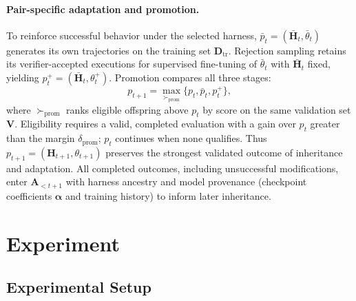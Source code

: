 \documentclass[11pt,a4paper]{article}
\begin{document}
\paragraph{Pair-specific adaptation and promotion.}
To reinforce successful behavior under the selected harness, $\bar p_t=(\bar{\mathbf{H}}_t,\bar\theta_t)$ generates its own trajectories on the training set $\mathbf{D}_{\mathrm{tr}}$. Rejection sampling retains its verifier-accepted executions for supervised fine-tuning of $\bar\theta_t$ with $\bar{\mathbf{H}}_t$ fixed, yielding $p_t^+=(\bar{\mathbf{H}}_t,\theta_t^+)$. Promotion compares all three stages:
\begin{equation}
p_{t+1}=\max_{\succ_{\mathrm{prom}}}\{p_t,\bar p_t,p_t^+\},
\label{eq:lineage-promote}
\end{equation}
where $\succ_{\mathrm{prom}}$ ranks eligible offspring above $p_t$ by score on the same validation set $\mathbf{V}$. Eligibility requires a valid, completed evaluation with a gain over $p_t$ greater than the margin $\delta_{\mathrm{prom}}$; $p_t$ continues when none qualifies. Thus $p_{t+1}=(\mathbf{H}_{t+1},\theta_{t+1})$ preserves the strongest validated outcome of inheritance and adaptation. All completed outcomes, including unsuccessful modifications, enter $\mathbf{A}_{<t+1}$ with harness ancestry and model provenance (checkpoint coefficients $\boldsymbol{\alpha}$ and training history) to inform later inheritance.

\section{Experiment}
\label{sec:experiment}

\subsection{Experimental Setup}
\label{sec:setup}
\end{document}
